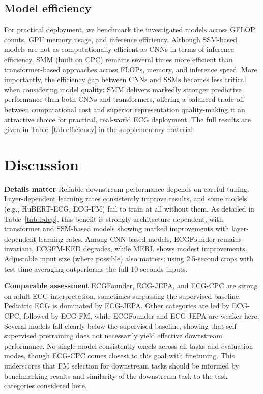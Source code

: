 \documentclass{article}
\newcommand{\heading}[1]{\noindent\textbf{#1}}
\begin{document}
        \subsection{Model efficiency}
        For practical deployment, we benchmark the investigated models across GFLOP counts, GPU memory usage, and inference efficiency. Although SSM-based models are not as computationally efficient as CNNs in terms of inference efficiency, SMM (built on CPC) remains several times more efficient than transformer-based approaches across FLOPs, memory, and inference speed. More importantly, the efficiency gap between CNNs and SSMs becomes less critical when considering model quality: SMM delivers markedly stronger predictive performance than both CNNs and transformers, offering a balanced trade-off between computational cost and superior representation quality-making it an attractive choice for practical, real-world ECG deployment. The full results are given in Table~\ref{tab:efficiency} in the supplementary material.



    \section{Discussion}
    \heading{Details matter} Reliable downstream performance depends on careful tuning. Layer-dependent learning rates consistently improve results, and some models (e.g., HuBERT-ECG, ECG-FM) fail to train at all without them. As detailed in Table~\ref{tab:lrdep}, this benefit is strongly architecture-dependent, with transformer and SSM-based models showing marked improvements with layer-dependent learning rates. Among CNN-based models, ECGFounder remains invariant, ECGFM-KED degrades, while MERL shows modest improvements. Adjustable input size (where possible) also matters: using 2.5-second crops with test-time averaging outperforms the full 10 seconds inputs.
    
    \heading{Comparable assessment} ECGFounder, ECG-JEPA, and ECG-CPC are strong on adult ECG interpretation, sometimes surpassing the supervised baseline. Pediatric ECG is dominated by ECG-JEPA. Other categories are led by ECG-CPC, followed by ECG-FM, while ECGFounder and ECG-JEPA are weaker here. Several models fall clearly below the supervised baseline, showing that self-supervised pretraining does not necessarily yield effective downstream performance. No single model consistently excels across all tasks and evaluation modes, though ECG-CPC comes closest to this goal with finetuning. This underscores that FM selection for downstream tasks should be informed by benchmarking results and similarity of the downstream task to the task categories considered here.
    
\end{document}
